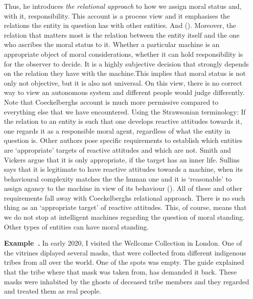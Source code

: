 \documentclass{article}
\newcounter{example}
\newenvironment{example}[1][]{\refstepcounter{example}\par\medskip
   \noindent \textbf{Example~\theexample. #1} \rmfamily}{\medskip}
\begin{document}
 Thus, he introduces \textit{the relational approach} to how we assign
moral status and, with it, responsibility. This account is a process view and it
emphasises the relations the entity in question has with other entities. And
 (\cite[p. 64]{coeckelbergh2014moral}). Moreover, the relation that
matters most is the relation between the entity itself and the one who ascribes
the moral status to it. Whether a particular machine is an appropriate object of
moral considerations, whether it can hold responsibility is for the observer to
decide. It is a highly subjective decision that strongly depends on the relation
they have with the machine.This implies that moral status is not only not
objective, but it is also not universal. On this view, there is no correct way
to view an autonomous system and different people would judge differently.\\
Note that Coeckelberghs account is much more permissive compared to everything
else that we have encountered. Using the Strawsonian terminology: If the
relation to an entity is such that one develops reactive attitudes towards it,
one regards it as a responsible moral agent, regardless of what the entity in
question is. Other authors pose specific requirements to establish which
entities are `appropriate' targets of reactive attitudes and which are not.
Smith and Vickers argue that it is only appropriate, if the target has an inner
life. Sullins says that it is legitimate to have reactive attitudes towards a
machine, when its behavioural complexity matches the the human one and it is
`reasonable' to assign agancy to the machine in view of its behaviour
(\cite[p. 169]{sullins2006robot}). All of these and other requirements fall away
with Coeckelberghs relational approach. There is no such thing as an
`appropriate target' of reactive attitudes. This, of course, means that we do not
stop at intelligent machines regarding the question of moral standing. Other
types of entities can have moral standing.

\begin{example}
	In early 2020, I visited the Wellcome Collection in London. One of
	the vitrines diplayed several masks, that were collected from different
	indigenous tribes from all over the world. One of the spots was empty.
	The guide explained that the tribe where that mask was taken from, has
	demanded it back. These masks were inhabited by the ghosts of deceased tribe
	members and they regarded and treated them as real people.
\end{example}
\end{document}
